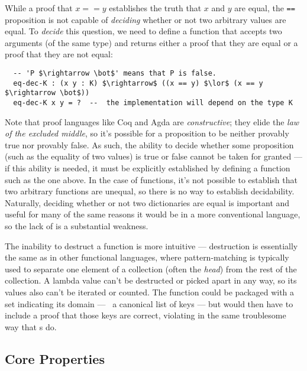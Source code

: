 
While a proof that $x == y$ establishes the truth that $x$ and $y$ are equal, the \texttt{==} proposition is not capable of \emph{deciding} whether or not two arbitrary values are equal.
%
To \emph{decide} this question, we need to define a function that accepts two arguments (of the same type) and returns either a proof that they are equal or a proof that they are not equal:
\begin{lstlisting}
  -- 'P $\rightarrow \bot$' means that P is false.
  eq-dec-K : (x y : K) $\rightarrow$ ((x == y) $\lor$ (x == y $\rightarrow \bot$))
  eq-dec-K x y = ?  --  the implementation will depend on the type K
\end{lstlisting}

Note that proof languages like Coq and Agda are \emph{constructive}; they elide the \emph{law of the excluded middle}, so it's possible for a proposition to be neither provably true nor provably false.
%
As such, the ability to decide whether some proposition (such as the equality of two values) is true or false cannot be taken for granted --- if this ability is needed, it must be explicitly established by defining a function such as the one above.
%
In the case of functions, it's not possible to establish that two arbitrary functions are unequal, so there is no way to establish decidability.
%
Naturally, deciding whether or not two dictionaries are equal is important and useful for many of the same reasons it would be in a more conventional language, so the lack of \DecidableEq{} is a substantial weakness.


The inability to destruct a function is more intuitive --- destruction is essentially the same as in other functional languages, where pattern-matching is typically used to separate one element of a collection (often the \emph{head}) from the rest of the collection.
%
A lambda value can't be destructed or picked apart in any way, so its values also can't be iterated or counted.
%
The function could be packaged with a set indicating its domain --- \ie{}~a canonical list of keys --- but would then have to include a proof that those keys are correct, violating \SemTot{} in the same troublesome way that \cal{}s do.

\subsection{Core Properties}

